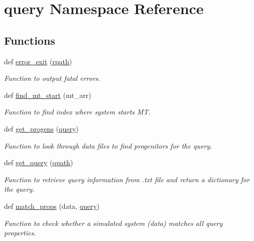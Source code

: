 \hypertarget{namespacequery}{}\section{query Namespace Reference}
\label{namespacequery}
\subsection*{Functions}
\begin{DoxyCompactItemize}
\item 
def \hyperlink{namespacequery_ab4cc339827af9c220b7b48313f8307e2}{error\+\_\+exit} (\hyperlink{namespacequery_a9391898f449326a0aae5c74a2f8f2da4}{rpath})
\begin{DoxyCompactList}\small\item\em Function to output fatal errors. \end{DoxyCompactList}\item 
def \hyperlink{namespacequery_af3cc8bfffa803d1a634868d08e9cedb7}{find\+\_\+mt\+\_\+start} (mt\+\_\+arr)
\begin{DoxyCompactList}\small\item\em Function to find index where system starts MT. \end{DoxyCompactList}\item 
def \hyperlink{namespacequery_aa6657f1df72e61cb1a20d05df95d7dec}{get\+\_\+progens} (\hyperlink{namespacequery_a7077167865224233566753fc78aadb36}{query})
\begin{DoxyCompactList}\small\item\em Function to look through data files to find progenitors for the query. \end{DoxyCompactList}\item 
def \hyperlink{namespacequery_a5c2d384360f955a8d047fe01db312f88}{get\+\_\+query} (\hyperlink{namespacequery_a46f3ad2dbb08867f79cc0b7699518b21}{qpath})
\begin{DoxyCompactList}\small\item\em Function to retrieve query information from .txt file and return a dictionary for the query. \end{DoxyCompactList}\item 
def \hyperlink{namespacequery_a58d8e5311469ef07a2a1f81db99edc57}{match\+\_\+props} (data, \hyperlink{namespacequery_a7077167865224233566753fc78aadb36}{query})
\begin{DoxyCompactList}\small\item\em Function to check whether a simulated system (data) matches all query properties. \end{DoxyCompactList}\item 

\end{DoxyCompactItemize}
